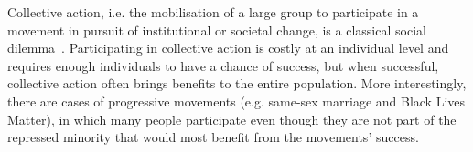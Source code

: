 \documentclass[letterpaper, 10 pt, conference]{ieeeconf}  %
\begin{document}
Collective action, i.e. the mobilisation of a large group to participate in a movement in pursuit of institutional or societal change, is a classical social dilemma~\cite{cantoni_protests_2024}. Participating in collective action is costly at an individual level and requires enough individuals to have a chance of success, but when successful, collective action often brings benefits to the entire population. More interestingly, there are cases of progressive movements (e.g. same-sex marriage and Black Lives Matter), in which many people participate even though they are not part of the repressed minority that would most benefit from the movements' success. 

\end{document}
